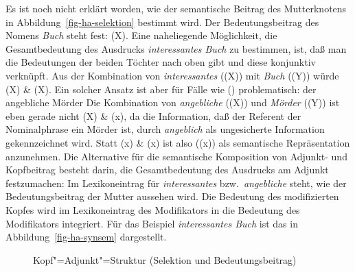 Es ist noch nicht erklärt worden, wie der semantische Beitrag des Mutterknotens in
Abbildung~\ref{fig-ha-selektion} bestimmt wird. Der Bedeutungsbeitrag des Nomens
\emph{Buch} steht fest: (X). Eine naheliegende Möglichkeit, die Gesamtbedeutung
des Ausdrucks \emph{interessantes Buch} zu bestimmen, ist, daß man die Bedeutungen 
der beiden Töchter nach oben gibt und diese konjunktiv verknüpft.
Aus der Kombination von \emph{interessantes} ((X)) mit \emph{Buch} ((Y))
würde (X) \& (X). Ein solcher Ansatz ist aber für Fälle wie ()
problematisch:
\ea
der angebliche Mörder
\z
Die Kombination von \emph{angebliche} ((X)) und {\em Mörder\/} ((Y)) ist eben
gerade nicht (X) \& (x), da die Information, daß der Referent der Nominalphrase
ein Mörder ist, durch \emph{angeblich} als ungesicherte Information gekennzeichnet wird.
Statt (x) \& (x) ist also ((x)) als semantische Repräsentation
anzunehmen.
Die Alternative für die semantische Komposition von Adjunkt- und Kopfbeitrag
besteht darin, die Gesamtbedeutung des Ausdrucks am Adjunkt festzumachen:
Im Lexikoneintrag für \emph{interessantes} bzw.\ \emph{angebliche}
steht, wie der Bedeutungsbeitrag der Mutter aussehen wird.
Die Bedeutung des modifizierten Kopfes wird im Lexikoneintrag des Modifikators 
in die Bedeutung des Modifikators integriert. Für das Beispiel \emph{interessantes Buch} ist das
in Abbildung~\vref{fig-ha-synsem} dargestellt.
\begin{figure}[htbp]
\caption{\label{fig-ha-synsem}Kopf"=Adjunkt"=Struktur (Selektion und Bedeutungsbeitrag)}
\end{figure}
